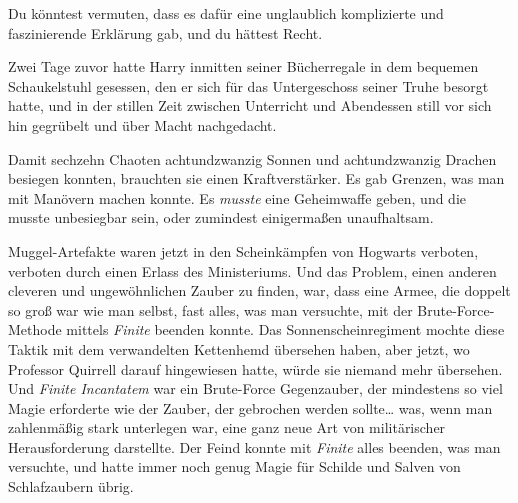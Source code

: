 Du könntest vermuten, dass es dafür eine unglaublich komplizierte und faszinierende Erklärung gab, und du hättest Recht.

Zwei Tage zuvor hatte Harry inmitten seiner Bücherregale in dem bequemen Schaukelstuhl gesessen, den er sich für das Untergeschoss seiner Truhe besorgt hatte, und in der stillen Zeit zwischen Unterricht und Abendessen still vor sich hin gegrübelt und über Macht nachgedacht.

Damit sechzehn Chaoten achtundzwanzig Sonnen und achtundzwanzig Drachen besiegen konnten, brauchten sie einen Kraftverstärker. Es gab Grenzen, was man mit Manövern machen konnte. Es \emph{musste} eine Geheimwaffe geben, und die musste unbesiegbar sein, oder zumindest einigermaßen unaufhaltsam.

Muggel-Artefakte waren jetzt in den Scheinkämpfen von Hogwarts verboten, verboten durch einen Erlass des Ministeriums. Und das Problem, einen anderen cleveren und ungewöhnlichen Zauber zu finden, war, dass eine Armee, die doppelt so groß war wie man selbst, fast alles, was man versuchte, mit der Brute-Force-Methode mittels \emph{Finite} beenden konnte. Das Sonnenscheinregiment mochte diese Taktik mit dem verwandelten Kettenhemd übersehen haben, aber jetzt, wo Professor Quirrell darauf hingewiesen hatte, würde sie niemand mehr übersehen. Und \emph{Finite Incantatem} war ein Brute-Force Gegenzauber, der mindestens so viel Magie erforderte wie der Zauber, der gebrochen werden sollte… was, wenn man zahlenmäßig stark unterlegen war, eine ganz neue Art von militärischer Herausforderung darstellte. Der Feind konnte mit \emph{Finite} alles beenden, was man versuchte, und hatte immer noch genug Magie für Schilde und Salven von Schlafzaubern übrig.

